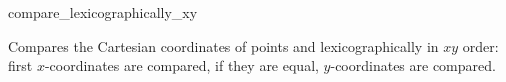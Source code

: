 \begin{ccRefFunction}{compare_lexicographically_xy}

      {Compares the Cartesian coordinates of points  and
        lexicographically in $xy$ order: first 
       $x$-coordinates are compared, if they are equal, $y$-coordinates
       are compared.}
\end{ccRefFunction}


